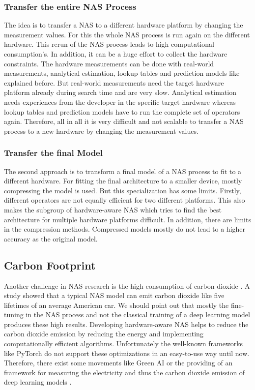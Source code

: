 \documentclass[conference]{IEEEtran}
\begin{document}
\subsubsection{Transfer the entire NAS Process}

The idea is to transfer a NAS to a different hardware platform by changing the measurement values. For this the whole NAS process is run again on the different hardware. This rerun of the NAS process leads to high computational consumption's. In addition, it can be a huge effort to collect the hardware constraints. The hardware measurements can be done with real-world measurements, analytical estimation, lookup tables and prediction models like explained before. But real-world measurements need the target hardware platform already during search time and are very slow. Analytical estimation needs experiences from the developer in the specific target hardware whereas lookup tables and prediction models have to run the complete set of operators again. Therefore, all in all it is very difficult and not scalable to transfer a NAS process to a new hardware by changing the measurement values. 

\subsubsection{Transfer the final Model}

The second approach is to transform a final model of a NAS process to fit to a different hardware. For fitting the final architecture to a smaller device, mostly compressing the model is used. But this specialization has some limits. Firstly, different operators are not equally efficient for two different platforms. This also makes the subgroup of hardware-aware NAS which tries to find the best architecture for multiple hardware platforms difficult. In addition, there are limits in the compression methods. Compressed models mostly do not lead to a higher accuracy as the original model. 

\subsection{Carbon Footprint}
Another challenge in NAS research is the high consumption of carbon dioxide \cite{bib7}. A study showed that a typical NAS model can emit carbon dioxide like five lifetimes of an average American car. We should point out that mostly the fine-tuning in the NAS process and not the classical training of a deep learning model produces these high results. Developing hardware-aware NAS helps to reduce the carbon dioxide emission by reducing the energy and implementing computationally efficient algorithms. Unfortunately the well-known frameworks like PyTorch do not support these optimizations in an easy-to-use way until now. Therefore, there exist some movements like Green AI \cite{bib8} or the providing of an framework for measuring the electricity and thus the carbon dioxide emission of deep learning models \cite{bib9}. 
\end{document}

